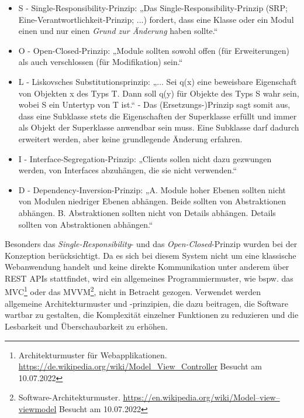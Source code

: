     \begin{itemize}
        \item S - Single-Responsibility-Prinzip: „Das Single-Responsibility-Prinzip (SRP; Eine-Verantwortlichkeit-Prinzip; ...) fordert, dass eine Klasse oder ein Modul einen und nur einen \textit{Grund zur Änderung} haben sollte.“ \cite{cleancode2009}
        \item O - Open-Closed-Prinzip: „Module sollten sowohl offen (für Erweiterungen) als auch verschlossen (für Modifikation) sein.“ \cite{ocpmeyer1988}
        \item L - Liskovsches Substitutionsprinzip: „... Sei q(x) eine beweisbare Eigenschaft von Objekten x des Typs T. Dann soll q(y) für Objekte des Typs S wahr sein, wobei S ein Untertyp von T ist.“ \cite{liskov2001behavioral} - Das (Ersetzungs-)Prinzip sagt somit aus, dass eine 
        Subklasse stets die Eigenschaften der Superklasse erfüllt und immer als Objekt der Superklasse anwendbar sein muss. Eine Subklasse darf dadurch erweitert werden, aber 
        keine grundlegende Änderung erfahren. 
        \item I - Interface-Segregation-Prinzip: „Clients sollen nicht dazu gezwungen werden, von Interfaces abzuhängen, die sie nicht verwenden.“ \cite{martin1996interface}
        \item D - Dependency-Inversion-Prinzip: „A. Module hoher Ebenen sollten nicht von Modulen niedriger Ebenen abhängen. Beide sollten von Abstraktionen abhängen. B. Abstraktionen sollten nicht von Details abhängen. Details sollten von Abstraktionen abhängen.“ \cite{martin2003agile}
    \end{itemize}
    Besonders das \textit{Single-Responsibility}- und das \textit{Open-Closed}-Prinzip wurden bei der Konzeption berücksichtigt. 
    Da es sich bei diesem System nicht um eine klassische 
    Webanwendung handelt und keine direkte Kommunikation unter anderem über \acs{REST} \acs{API}s stattfindet, wird ein allgemeines 
    Programmiermuster, wie bspw. das \ac{MVC}\footnote{Architekturmuster für Webapplikationen. \url{https://de.wikipedia.org/wiki/Model_View_Controller} Besucht am 10.07.2022} 
    oder das \ac{MVVM}\footnote{Software-Architekturmuster. \url{https://en.wikipedia.org/wiki/Model–view–viewmodel} Besucht am 10.07.2022 }, nicht 
    in Betracht gezogen. Verwendet werden allgemeine Architekturmuster und -prinzipien, die dazu beitragen, die Software wartbar 
    zu gestalten, die Komplexität einzelner Funktionen zu reduzieren und die Lesbarkeit und Überschaubarkeit zu erhöhen. 
    \pagebreak

